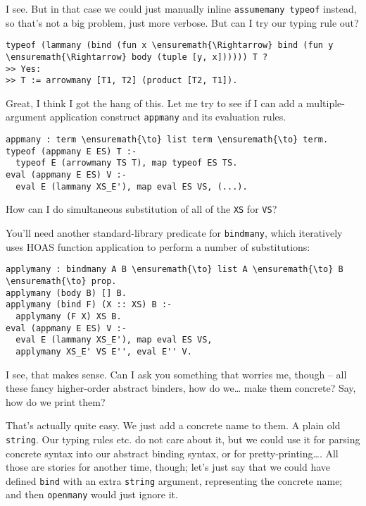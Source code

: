 \heroSTUDENT{} I see. But in that case we could just manually inline
\texttt{assumemany\ typeof} instead, so that's not a big problem, just
more verbose. But can I try our typing rule out?

\begin{verbatim}
typeof (lammany (bind (fun x \ensuremath{\Rightarrow} bind (fun y \ensuremath{\Rightarrow} body (tuple [y, x]))))) T ?
>> Yes:
>> T := arrowmany [T1, T2] (product [T2, T1]).
\end{verbatim}

\noindent
Great, I think I got the hang of this. Let me try to see if I can add a
multiple-argument application construct \texttt{appmany} and its
evaluation rules.

\begin{verbatim}
appmany : term \ensuremath{\to} list term \ensuremath{\to} term.
typeof (appmany E ES) T :-
  typeof E (arrowmany TS T), map typeof ES TS.
eval (appmany E ES) V :-
  eval E (lammany XS_E'), map eval ES VS, (...).
\end{verbatim}

\noindent
How can I do simultaneous substitution of all of the \texttt{XS} for
\texttt{VS}?

\heroADVISOR{} You'll need another standard-library predicate for
\texttt{bindmany}, which iteratively uses HOAS function application to
perform a number of substitutions:

\begin{verbatim}
applymany : bindmany A B \ensuremath{\to} list A \ensuremath{\to} B \ensuremath{\to} prop.
applymany (body B) [] B.
applymany (bind F) (X :: XS) B :-
  applymany (F X) XS B.
eval (appmany E ES) V :-
  eval E (lammany XS_E'), map eval ES VS,
  applymany XS_E' VS E'', eval E'' V.
\end{verbatim}

\heroSTUDENT{} I see, that makes sense. Can I ask you something that worries
me, though -- all these fancy higher-order abstract binders, how do
we\ldots{} make them concrete? Say, how do we print them?

\heroADVISOR{} That's actually quite easy. We just add a concrete name to
them. A plain old \texttt{string}. Our typing rules etc. do not care
about it, but we could use it for parsing concrete syntax into our
abstract binding syntax, or for pretty-printing\ldots{}. All those are
stories for another time, though; let's just say that we could have
defined \texttt{bind} with an extra \texttt{string} argument,
representing the concrete name; and then \texttt{openmany} would just
ignore it.

